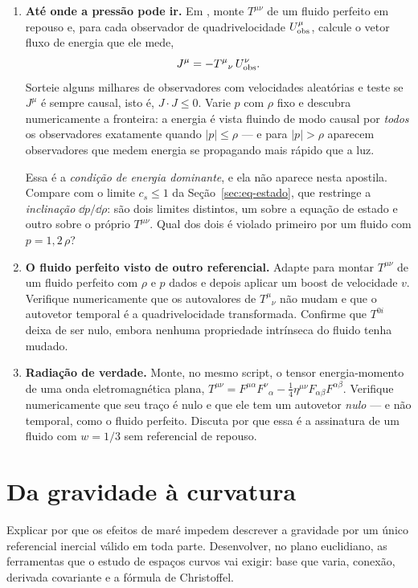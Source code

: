 \documentclass[12pt,a4paper,oneside]{book}
\theoremstyle{rgplain}
\theoremstyle{rgremark}
\begin{document}
\begin{enumerate}
  \item \textbf{Até onde a pressão pode ir.} Em ,
monte $T^{\mu\nu}$ de um fluido perfeito em repouso e, para cada observador
de quadrivelocidade $U^\mu_{\rm obs}$, calcule o vetor fluxo de energia que ele
mede,
\[
  J^\mu=-T^\mu{}_\nu\,U^\nu_{\rm obs} .
\]
Sorteie alguns milhares de observadores com velocidades aleatórias e teste se
$J^\mu$ é sempre causal, isto é, $J\cdot J\le0$. Varie $p$ com $\rho$ fixo e
descubra numericamente a fronteira: a energia é vista fluindo de modo causal
por \emph{todos} os observadores exatamente quando $|p|\le\rho$ --- e para
$|p|>\rho$ aparecem observadores que medem energia se propagando mais rápido
que a luz.

  Essa é a \emph{condição de energia dominante}, e ela não aparece nesta
apostila. Compare com o limite $c_s\le1$ da Seção~\ref{sec:eq-estado}, que
restringe a \emph{inclinação} $\dd p/\dd\rho$: são dois limites distintos, um
sobre a equação de estado e outro sobre o próprio $T^{\mu\nu}$. Qual dos dois
é violado primeiro por um fluido com $p=1{,}2\,\rho$?

  \item \textbf{O fluido perfeito visto de outro referencial.} Adapte
 para montar $T^{\mu\nu}$ de um fluido perfeito
com $\rho$ e $p$ dados e depois aplicar um boost de velocidade $v$. Verifique
numericamente que os autovalores de $T^\mu{}_\nu$ não mudam e que o
autovetor temporal é a quadrivelocidade transformada. Confirme que $T^{0i}$
deixa de ser nulo, embora nenhuma propriedade intrínseca do fluido tenha
mudado.

  \item \textbf{Radiação de verdade.} Monte, no mesmo script, o tensor
energia-momento de uma onda eletromagnética plana,
$T^{\mu\nu}=F^{\mu\alpha}F^\nu{}_\alpha
-\tfrac14\eta^{\mu\nu}F_{\alpha\beta}F^{\alpha\beta}$. Verifique
numericamente que seu traço é nulo e que ele tem um autovetor \emph{nulo}
--- e não temporal, como o fluido perfeito. Discuta por que essa é a
assinatura de um fluido com $w=1/3$ sem referencial de repouso.
\end{enumerate}


\chapter{Da gravidade à curvatura}
\label{cap:gravidade-curvatura}

\begin{objetivos}
Explicar por que os efeitos de maré impedem descrever a gravidade por um único
referencial inercial válido em toda parte. Desenvolver, no plano euclidiano, as
ferramentas que o estudo de espaços curvos vai exigir: base que varia, conexão,
derivada covariante e a fórmula de Christoffel.
\end{objetivos}
\end{document}

